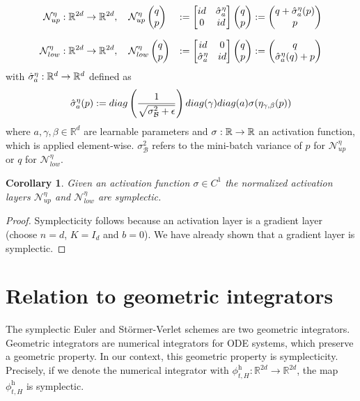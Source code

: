 \documentclass[twoside,a4paper]{article}
\newtheorem{corollary}{Corollary}
\begin{document}
\begin{alignat*}{2}
	\mathcal{N}^{\eta}_{up} &: \mathbb{R}^{2d} \to \mathbb{R}^{2d}, \quad
	\mathcal{N}^{\eta}_{up} \begin{pmatrix} q \\ p \end{pmatrix} &:= \begin{bmatrix} id & {\hat{\sigma}^{\eta}_a} \\ 0 & id \end{bmatrix} \begin{pmatrix} q \\ p \end{pmatrix} := \begin{pmatrix}
		q + \hat{\sigma}^{\eta}_a(p) \\
		p
	\end{pmatrix} \\[7pt]
	\mathcal{N}^{\eta}_{low} &: \mathbb{R}^{2d} \to \mathbb{R}^{2d}, \quad
	\mathcal{N}^{\eta}_{low} \begin{pmatrix} q \\ p \end{pmatrix} &:= \begin{bmatrix} id & 0 \\ {\hat{\sigma}^{\eta}_a} & id \end{bmatrix} \begin{pmatrix} q \\ p \end{pmatrix} := \begin{pmatrix}
		q \\
		\hat{\sigma}^{\eta}_a(q) + p
	\end{pmatrix}
\end{alignat*}
with $\hat{\sigma}^{\eta}_a : \mathbb{R}^d \to \mathbb{R}^d$ defined as
\begin{equation*}
	\hat{\sigma}^{\eta}_a(p) := 
	diag\left( \frac{1}{\sqrt{\sigma^2_\mathcal{B} + \epsilon}} \right) diag(\gamma)
	diag(a) \sigma(\eta_{\gamma, \beta}(p))
\end{equation*}
where $a, \gamma, \beta \in \mathbb{R}^d$ are learnable parameters and 
$\sigma : \mathbb{R} \to \mathbb{R}$ an activation function,
which is applied element-wise. $\sigma^2_\mathcal{B}$ refers to the mini-batch variance of $p$
for $\mathcal{N}^{\eta}_{up}$ or $q$ for $\mathcal{N}^{\eta}_{low}$.

\begin{corollary}
	Given an activation function $\sigma \in C^1$
	the normalized activation layers $\mathcal{N}^{\eta}_{up}$ and $\mathcal{N}^{\eta}_{low}$
	are symplectic.
\end{corollary}
\begin{proof}
	Symplecticity follows because an activation layer is a gradient layer
	(choose $n=d$, $K=I_d$ and $b=0$). We have already shown that a gradient layer is symplectic.
\end{proof}

\section{Relation to geometric integrators}

The symplectic Euler and Störmer-Verlet schemes are two geometric integrators. Geometric integrators
are numerical integrators for ODE systems, which preserve a geometric property. In our context,
this geometric property is symplecticity. Precisely, if we denote the numerical integrator with
$\phi^{\text{h}}_{t,H} : \mathbb{R}^{2d} \to \mathbb{R}^{2d}$, the map $\phi^{\text{h}}_{t,H}$ is
symplectic.
\end{document}
